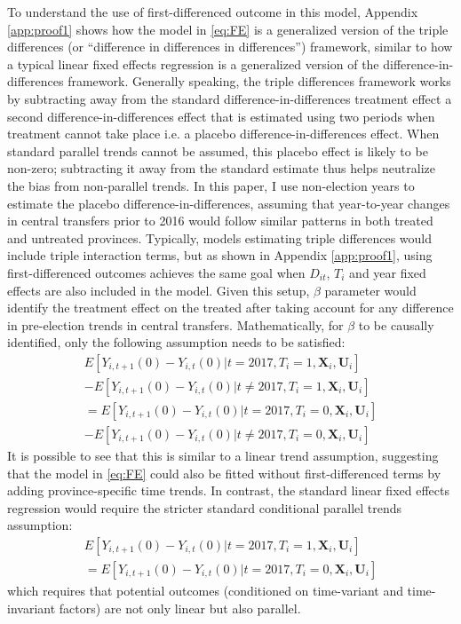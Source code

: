 \documentclass[12pt]{article}
\newcommand{\1}{\mathbbm{1}}
\begin{document}
To understand the use of first-differenced outcome in this model, Appendix \ref{app:proof1} shows how the model in \ref{eq:FE} is a generalized version of the triple differences (or ``difference in differences in differences'') framework, similar to how a typical linear fixed effects regression is a generalized version of the difference-in-differences framework. Generally speaking, the triple differences framework works by subtracting away from the standard difference-in-differences treatment effect a second difference-in-differences effect that is estimated using two periods when treatment cannot take place i.e. a placebo difference-in-differences effect. When standard parallel trends cannot be assumed, this placebo effect is likely to be non-zero; subtracting it away from the standard estimate thus helps neutralize the bias from non-parallel trends. In this paper, I use non-election years to estimate the placebo difference-in-differences,  assuming that year-to-year changes in central transfers prior to 2016 would follow similar patterns in both treated and untreated provinces. Typically, models estimating triple differences would include triple interaction terms, but as shown in Appendix \ref{app:proof1}, using first-differenced outcomes achieves the same goal when $D_{it}$, $T_i$ and year fixed effects are also included in the model. Given this setup, $\beta$ parameter would identify the treatment effect on the treated after taking account for any difference in pre-election trends in central transfers. Mathematically, for $\beta$ to be causally identified, only the following assumption needs to be satisfied:
\begin{align*}
E[Y_{i,t+1}(0) - Y_{i,t}(0) | t = 2017, T_i = 1, \mathbf{X}_i, \mathbf{U}_i] \\  - E[Y_{i,t+1}(0) - Y_{i,t}(0) | t \neq 2017, T_i = 1, \mathbf{X}_i, \mathbf{U}_i] \\
= E[Y_{i,t+1}(0) - Y_{i,t}(0) | t = 2017, T_i = 0, \mathbf{X}_i, \mathbf{U}_i] \\  - E[Y_{i,t+1}(0) - Y_{i,t}(0) |  t \neq 2017, T_i = 0, \mathbf{X}_i, \mathbf{U}_i]
\end{align*} 
It is possible to see that this is similar to a linear trend assumption, suggesting that the model in \ref{eq:FE} could also be fitted without first-differenced terms by adding province-specific time trends.  In contrast, the standard linear fixed effects regression would require the stricter standard conditional parallel trends assumption:
\begin{align*}
E[Y_{i,t+1}(0) - Y_{i,t}(0) | t = 2017, T_i = 1, \mathbf{X}_i, \mathbf{U}_i] \\
= E[Y_{i,t+1}(0) - Y_{i,t}(0) |  t = 2017, T_i = 0, \mathbf{X}_i, \mathbf{U}_i]
\end{align*} 
which requires that potential outcomes (conditioned on time-variant and time-invariant factors) are not only linear but also parallel.
\end{document}
